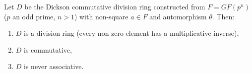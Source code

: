 Let $D$ be the Dickson commutative division ring constructed from $F = GF(p^n)$ ($p$ an odd prime, $n > 1$) with non-square $a \in F$ and automorphism $\theta$. Then:

\begin{enumerate}
\item[(i)] $D$ is a division ring (every non-zero element has a multiplicative inverse),
\item[(ii)] $D$ is commutative,
\item[(iii)] $D$ is never associative.
\end{enumerate}
